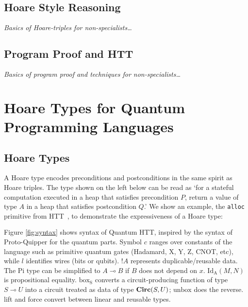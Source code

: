 \documentclass[acmsmall,nonacm,timestamp]{acmart}
\newcommand{\type}[1]{\textrm{\textbf{#1}}}
\begin{document}
\subsection{Hoare Style Reasoning}
\textit{Basics of Hoare-triples for non-specialists\ldots}

\subsection{Program Proof and HTT}
\textit{Basics of program proof and techniques for non-specialists\ldots}

\section{Hoare Types for Quantum Programming Languages}

\subsection{Hoare Types}
A Hoare type encodes preconditions and postconditions in the same spirit as Hoare triples. The type shown on the left below can be read as `for a stateful computation executed in a heap that satisfies precondition $P$, return a value of type $A$ in a heap that satisfies postcondition $Q$.' We show an example, the \lstinline{alloc} primitive from HTT~\cite{nanevski_hoare_2008}, to demonstrate the expressiveness of a Hoare type:

Figure \ref{fig:syntax} shows syntax of Quantum HTT, inspired by the syntax of Proto-Quipper for the quantum parts. Symbol $c$ ranges over constants of the language such as primitive quantum gates (Hadamard, X, Y, Z, CNOT, etc), while $l$ identifies wires (bits or qubits). $!A$ represents duplicable/reusable data. The Pi type can be simplified to $A \multimap B$ if $B$ does not depend on $x$. $\mathrm{Id_A}(M, N)$ is propositional equality. $\mathrm{box_S}$ converts a circuit-producing function of type $S \multimap U$ into a circuit treated as data of type $\type{Circ}(S, U)$; $\mathrm{unbox}$ does the reverse. lift and force convert between linear and reusable types.
\end{document}

